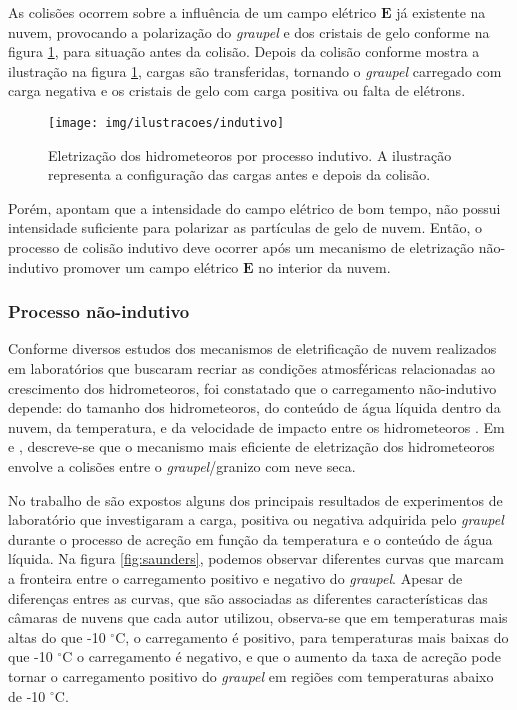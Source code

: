 As colisões ocorrem sobre a influência de um campo elétrico $\mathbf{E}$ já existente na nuvem, provocando a polarização do \textit{graupel} e dos cristais de gelo conforme na figura \ref{fig:ind}, para situação antes da colisão. Depois da colisão conforme mostra a ilustração na figura \ref{fig:ind}, cargas são transferidas, tornando o \textit{graupel} carregado com carga negativa e os cristais de gelo com carga positiva ou falta de elétrons.

\begin{figure}[ht]
   \centering
   \texttt{[image: img/ilustracoes/indutivo]}
   \caption{Eletrização dos hidrometeoros por processo indutivo. A ilustração representa a configuração das cargas antes e depois da colisão.}
   \label{fig:ind}
\end{figure}

Porém,  apontam que a intensidade do campo elétrico de bom tempo, não possui intensidade suficiente para polarizar as partículas de gelo de nuvem. Então, o processo de colisão indutivo deve ocorrer após um mecanismo de eletrização não-indutivo promover um campo elétrico $\mathbf{E}$ no interior da nuvem. 

\subsubsection{Processo não-indutivo}

Conforme diversos estudos dos mecanismos de eletrificação de nuvem realizados em laboratórios que buscaram recriar as condições atmosféricas relacionadas ao crescimento dos hidrometeoros, foi constatado que o carregamento não-indutivo depende: do tamanho dos hidrometeoros, do conteúdo de água líquida dentro da nuvem, da temperatura, e da velocidade de impacto entre os hidrometeoros  \cite{reynolds1957, Takahashi1978, baker1994, Saunders1999, pereyra2000}. Em  e , descreve-se que o mecanismo mais eficiente de eletrização dos hidrometeoros envolve a colisões entre o \textit{graupel}/granizo com neve seca. 

No trabalho de  são expostos alguns dos principais resultados de experimentos de laboratório que investigaram a carga, positiva ou negativa adquirida pelo \textit{graupel} durante o processo de acreção em função da temperatura e o conteúdo de água líquida. Na figura  \ref{fig:saunders}, podemos observar diferentes curvas que marcam a fronteira entre o carregamento positivo e negativo do \textit{graupel}. Apesar de diferenças entres as curvas, que são associadas as diferentes características das câmaras de nuvens que cada autor utilizou, observa-se que em temperaturas mais altas do que -10 $^{\circ}$C, o carregamento é positivo, para temperaturas mais baixas do que -10 $^{\circ}$C o carregamento é negativo, e que o aumento da taxa de acreção pode tornar o carregamento positivo do \textit{graupel} em regiões com temperaturas abaixo de -10 $^{\circ}$C.

